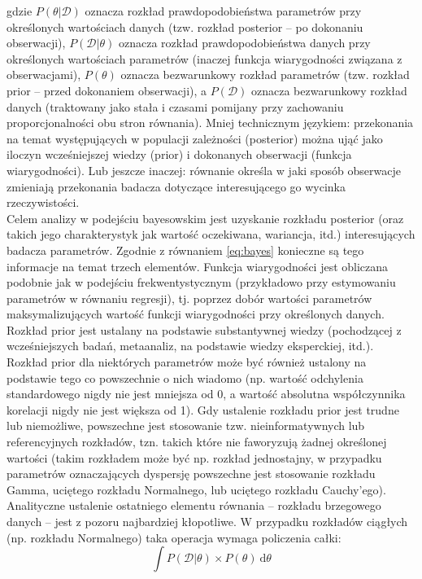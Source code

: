 \documentclass[man]{apa6}
\begin{document}
gdzie $P(\theta | \mathcal{D})$ oznacza rozkład prawdopodobieństwa parametrów przy określonych wartościach danych (tzw. rozkład posterior -- po dokonaniu obserwacji), $P(\mathcal{D} | \theta)$ oznacza rozkład prawdopodobieństwa danych przy określonych wartościach parametrów (inaczej funkcja wiarygodności związana z obserwacjami), $P(\theta)$ oznacza bezwarunkowy rozkład parametrów (tzw. rozkład prior -- przed dokonaniem obserwacji), a $P(\mathcal{D})$ oznacza bezwarunkowy rozkład danych (traktowany jako stała i czasami pomijany przy zachowaniu proporcjonalności obu stron równania). Mniej technicznym językiem: przekonania na temat występujących w populacji zależności (posterior) można ująć jako iloczyn wcześniejszej wiedzy (prior) i dokonanych obserwacji (funkcja wiarygodności). Lub jeszcze inaczej: równanie określa w jaki sposób obserwacje zmieniają przekonania badacza dotyczące interesującego go
wycinka rzeczywistości. \\
Celem analizy w podejściu bayesowskim jest uzyskanie rozkładu posterior (oraz takich jego charakterystyk jak wartość oczekiwana, wariancja, itd.) interesujących badacza parametrów. Zgodnie z równaniem \ref{eq:bayes} konieczne są tego informacje na temat trzech elementów. Funkcja wiarygodności jest obliczana podobnie jak w podejściu frekwentystycznym (przykładowo przy estymowaniu parametrów w równaniu regresji), tj. poprzez dobór wartości parametrów maksymalizujących wartość funkcji wiarygodności przy określonych danych. Rozkład prior jest ustalany na podstawie substantywnej wiedzy (pochodzącej z wcześniejszych badań, metaanaliz, na podstawie wiedzy eksperckiej, itd.). Rozkład prior dla niektórych parametrów może być również ustalony na podstawie tego co powszechnie o nich wiadomo (np. wartość odchylenia standardowego nigdy nie jest mniejsza od 0, a wartość absolutna współczynnika korelacji nigdy nie jest większa od 1). Gdy ustalenie rozkładu prior jest trudne lub niemożliwe, powszechne jest stosowanie tzw. nieinformatywnych lub referencyjnych rozkładów, tzn. takich które nie faworyzują żadnej określonej wartości (takim rozkładem może być np. rozkład jednostajny, w przypadku parametrów oznaczających dyspersję powszechne jest stosowanie rozkładu Gamma, uciętego rozkładu Normalnego, lub uciętego rozkładu Cauchy'ego).\\
Analityczne ustalenie ostatniego elementu równania -- rozkładu brzegowego danych -- jest z pozoru najbardziej kłopotliwe. W przypadku rozkładów ciągłych (np. rozkładu Normalnego) taka operacja wymaga policzenia całki:
\begin{equation}
    \int P(\mathcal{D} | \theta)\times P(\theta)\ \mathrm{d}\theta
\end{equation}
\end{document}
